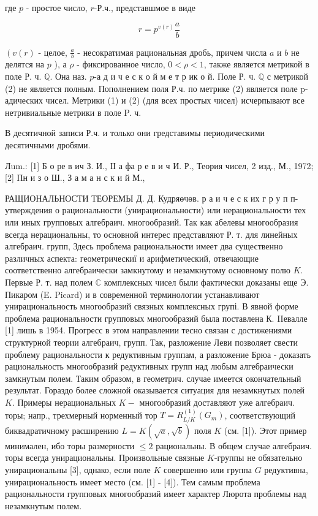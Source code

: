 \documentclass[10pt]{article}
\begin{document}
где $p$ - простое число, $r$-Р.ч., представшмое в виде



\[

r=p^{v(r)} \frac{a}{b}

\]



$\left(v(r)\right.$ - целое, $\frac{a}{b}$ - несократимая рациональная дробь, причем числа $a$ и $b$ не делятся на $p$ ), а $\rho$ - фиксированное число, $0<\rho<1$, также является метрикой в поле Р. ч. $\mathbb{Q}$. Она наз. $p$-а д и ч е с к о й м е т р ик о й. Поле Р. ч. $\mathbb{Q}$ с метрикой (2) не является полным. Пополнением поля Р.ч. по метрике (2) является поле p-адических чисел. Метрики (1) и (2) (для всех простых чисел) исчерпывают все нетривиальные метрики в поле P. ч.



В десятичной записи Р.ч. и только они гредставимы периодическими десятичными дробями.



Лum.: [1] Б о ре в ич З. И., ІІ а фа р е в и ч И. Р., Теория чисел, 2 изд., М., 1972; [2] Пн и з о Ш., З а м а н с к и й М.,



РАЩИОНАЛЬНОСТИ ТЕОРЕМЫ Д. Д. Кудряөчөв. р а и ч е с к их г р у п п- утверждения о рациональности (унирациональности) или нерациональности тех или иных групповых алгебраич. многообразий. Так как абелевы многообразия всегда нерациональны, то основной интерес представляют Р. т. для линейных алгебраич. групп, Здесь проблема рациональности имеет два существенно различных аспекта: геометрическиї и арифметический, отвечающие соответственно алгебраически замкнутому и незамкнутому основному полю $K$. Первые Р. т. над полем $\mathbb{C}$ комплексных чисел были фактически доказаны еще Э. Пикаром (E. Picard) и в современной терминологии устанавливают унирациональность многообразий связных комплексных групі. В явной форме проблема рациональности групповых многообразий была поставлена К. IIевалле [1] лишь в 1954. Прогресс в этом направлении тесно связан с достижениями структурной теории алгебраич, групп. Так, разложение Леви позволяет свести проблему рациональности к редуктивным группам, а разложение Брюа - доказать рациональность многообразий редуктивных групп над любым алгебраически замкнутым полем. Таким образом, в геометрич. случае имеется окончательный результат. Гораздо более сложной оказывается ситуация для незамкнутых полей $K$. Примеры нерациональных $K-$ многообразий доставляют уже алгебраич. торы; напр., трехмерный норменный тор $T=R_{L / K}^{(1)}\left(G_{m}\right)$, соответствующий биквадратичному расширению $L=K(\sqrt{a}, \sqrt{b})$ поля $K$ (см. [1]). Этот пример минимален, ибо торы размерности $\leqslant 2$ рациональны. В общем случае алгебраич. торы всегда унирациональны. Произвольные связные $K$-группы не обязательно унирациональны [3], однако, если поле $K$ совершенно или группа $G$ редуктивна, унирациональность имеет место (см. [1] - [4]). Тем самым проблема рациональности групповых многообразий имеет характер Люрота проблемы над незамкнутым полем.
\end{document}
